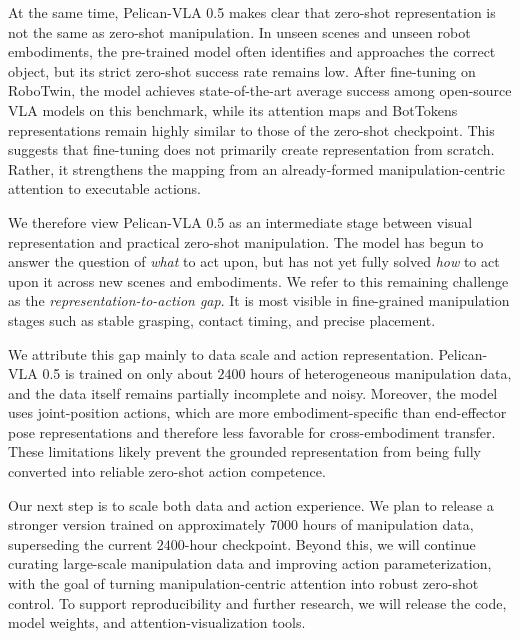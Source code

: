 \documentclass[a4paper,table]{extarticle}
\begin{document}
At the same time, Pelican-VLA 0.5 makes clear that zero-shot representation is not the same as zero-shot manipulation. In unseen scenes and unseen robot embodiments, the pre-trained model often identifies and approaches the correct object, but its strict zero-shot success rate remains low. After fine-tuning on RoboTwin, the model achieves state-of-the-art average success among open-source VLA models on this benchmark, while its attention maps and BotTokens representations remain highly similar to those of the zero-shot checkpoint. This suggests that fine-tuning does not primarily create representation from scratch. Rather, it strengthens the mapping from an already-formed manipulation-centric attention to executable actions.

We therefore view Pelican-VLA 0.5 as an intermediate stage between visual representation and practical zero-shot manipulation. The model has begun to answer the question of \emph{what} to act upon, but has not yet fully solved \emph{how} to act upon it across new scenes and embodiments. We refer to this remaining challenge as the \emph{representation-to-action gap}. It is most visible in fine-grained manipulation stages such as stable grasping, contact timing, and precise placement.

We attribute this gap mainly to data scale and action representation. Pelican-VLA 0.5 is trained on only about $2400$ hours of heterogeneous manipulation data, and the data itself remains partially incomplete and noisy. Moreover, the model uses joint-position actions, which are more embodiment-specific than end-effector pose representations and therefore less favorable for cross-embodiment transfer. These limitations likely prevent the grounded representation from being fully converted into reliable zero-shot action competence.

Our next step is to scale both data and action experience. We plan to release a stronger version trained on approximately $7000$ hours of manipulation data, superseding the current $2400$-hour checkpoint. Beyond this, we will continue curating large-scale manipulation data and improving action parameterization, with the goal of turning manipulation-centric attention into robust zero-shot control. To support reproducibility and further research, we will release the code, model weights, and attention-visualization tools.



\pagebreak



\end{document}

